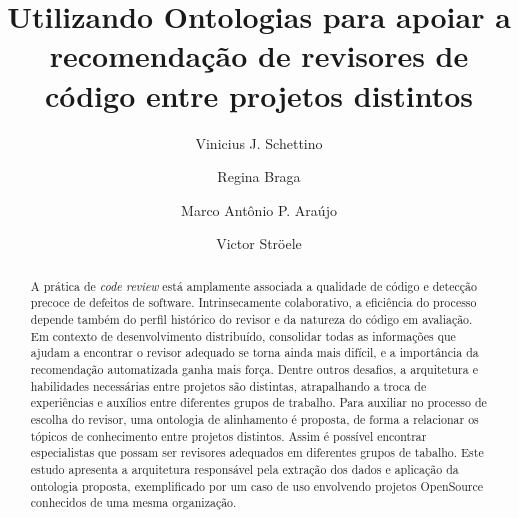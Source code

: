 \documentclass[sigconf]{acmart}
\begin{document}
\title{Utilizando Ontologias para apoiar a recomendação de revisores de código entre projetos distintos}

\author{Vinicius J. Schettino}

\author{Regina Braga}

\author{Marco Antônio P. Araújo}

\author{Victor Ströele}

\renewcommand{\shortauthors}{Schettino et al.}


\begin{abstract}
A prática de \textit{code review} está amplamente associada a qualidade de código e detecção precoce de defeitos de software. Intrinsecamente colaborativo, a eficiência do processo depende também do perfil histórico do revisor e da natureza do código em avaliação. Em contexto de desenvolvimento distribuído, consolidar todas as informações que ajudam a encontrar o revisor adequado se torna ainda mais difícil, e a importância da recomendação automatizada ganha mais força. Dentre outros desafios, a arquitetura e habilidades necessárias entre projetos são distintas, atrapalhando a troca de experiências e auxílios entre diferentes grupos de trabalho. Para auxiliar no processo de escolha do revisor, uma ontologia de alinhamento é proposta, de forma a relacionar os tópicos de conhecimento entre projetos distintos. Assim é possível encontrar especialistas que possam ser revisores adequados em diferentes grupos de tabalho. Este estudo apresenta a  arquitetura responsável pela extração dos dados e aplicação da ontologia proposta, exemplificado por um caso de uso envolvendo projetos OpenSource conhecidos de uma mesma organização.
\end{abstract}
\end{document}
